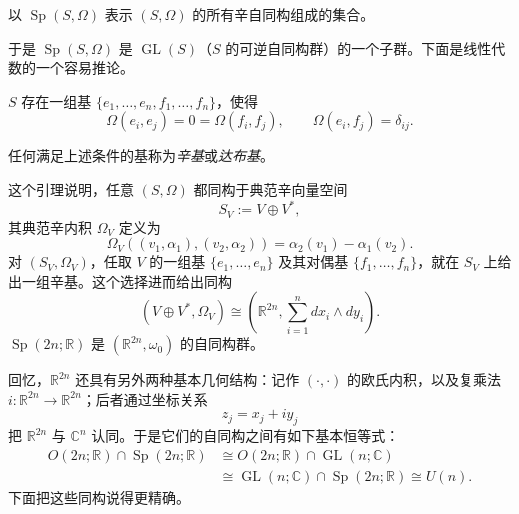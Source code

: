 \begin{definition}
\label{def:symplectic-linear-group}
以 $\operatorname{Sp}(S,\Omega)$ 表示 $(S,\Omega)$ 的所有辛自同构组成的集合。
\end{definition}

于是 $\operatorname{Sp}(S,\Omega)$ 是 $\operatorname{GL}(S)$（$S$ 的可逆自同构群）的一个子群。下面是线性代数的一个容易推论。

\begin{lemma}
\label{lem:symplectic-basis}
$S$ 存在一组基 $\{e_1,\ldots,e_n,f_1,\ldots,f_n\}$，使得
\begin{equation}
  \Omega(e_i,e_j)=0=\Omega(f_i,f_j),
  \qquad \Omega(e_i,f_j)=\delta_{ij}.
  \label{eq:2.2.11}
\end{equation}
\end{lemma}

任何满足上述条件的基称为\emph{辛基}或\emph{达布基}。

这个引理说明，任意 $(S,\Omega)$ 都同构于典范辛向量空间
\[
  S_V:=V\oplus V^*,
\]
其典范辛内积 $\Omega_V$ 定义为
\begin{equation}
  \Omega_V((v_1,\alpha_1),(v_2,\alpha_2))
  =\alpha_2(v_1)-\alpha_1(v_2).
  \label{eq:2.2.12}
\end{equation}
对 $(S_V,\Omega_V)$，任取 $V$ 的一组基 $\{e_1,\ldots,e_n\}$ 及其对偶基 $\{f_1,\ldots,f_n\}$，就在 $S_V$ 上给出一组辛基。这个选择进而给出同构
\[
  (V\oplus V^*,\Omega_V)
  \cong\left(\mathbb R^{2n},\sum_{i=1}^n dx_i\wedge dy_i\right).
\]
$\operatorname{Sp}(2n;\mathbb R)$ 是 $(\mathbb R^{2n},\omega_0)$ 的自同构群。

回忆，$\mathbb R^{2n}$ 还具有另外两种基本几何结构：记作 $(\mathord\cdot,\mathord\cdot)$ 的欧氏内积，以及复乘法
$i:\mathbb R^{2n}\to\mathbb R^{2n}$；后者通过坐标关系
\[
  z_j=x_j+iy_j
\]
把 $\mathbb R^{2n}$ 与 $\mathbb C^n$ 认同。于是它们的自同构之间有如下基本恒等式：
\[
\begin{split}
 O(2n;\mathbb R)\cap\operatorname{Sp}(2n;\mathbb R)
 &\cong O(2n;\mathbb R)\cap\operatorname{GL}(n;\mathbb C)\\
 &\cong\operatorname{GL}(n;\mathbb C)\cap\operatorname{Sp}(2n;\mathbb R)
 \cong U(n).
\end{split}
\]
下面把这些同构说得更精确。

